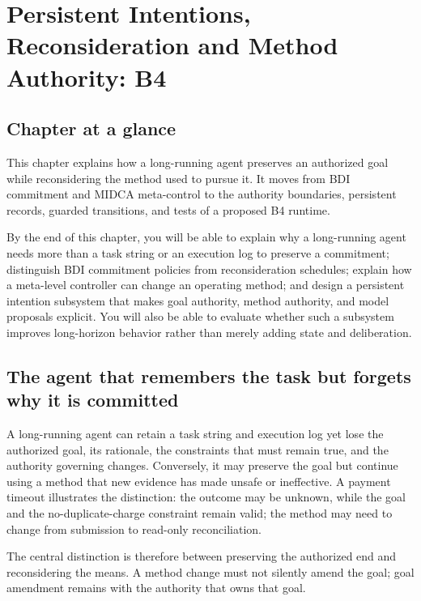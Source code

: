 \chapter{Persistent Intentions, Reconsideration and Method Authority: B4}
\label{ch:persistent-intentions-b4}

\section*{Chapter at a glance}
{}

This chapter explains how a long-running agent preserves an authorized goal while reconsidering the method used to pursue it. It moves from BDI commitment and MIDCA meta-control to the authority boundaries, persistent records, guarded transitions, and tests of a proposed B4 runtime.

\begin{learningbox}
By the end of this chapter, you will be able to explain why a long-running agent needs more than a task string or an execution log to preserve a commitment; distinguish BDI commitment policies from reconsideration schedules; explain how a meta-level controller can change an operating method; and design a persistent intention subsystem that makes goal authority, method authority, and model proposals explicit. You will also be able to evaluate whether such a subsystem improves long-horizon behavior rather than merely adding state and deliberation.
\end{learningbox}

\section{The agent that remembers the task but forgets why it is committed}
\label{sec:ch15-opening}

A long-running agent can retain a task string and execution log yet lose the authorized goal, its rationale, the constraints that must remain true, and the authority governing changes. Conversely, it may preserve the goal but continue using a method that new evidence has made unsafe or ineffective. A payment timeout illustrates the distinction: the outcome may be unknown, while the goal and the no-duplicate-charge constraint remain valid; the method may need to change from submission to read-only reconciliation.

The central distinction is therefore between preserving the authorized end and reconsidering the means. A method change must not silently amend the goal; goal amendment remains with the authority that owns that goal.

